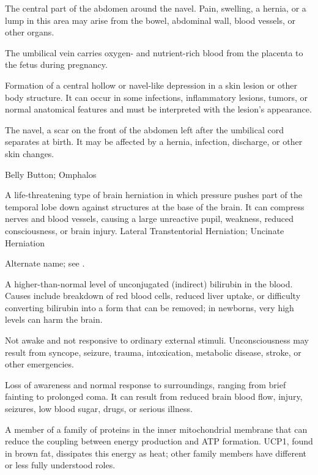  The central part of the abdomen around the navel. Pain, swelling, a hernia, or a lump in this area may arise from the bowel, abdominal wall, blood vessels, or other organs.

 The umbilical vein carries oxygen- and nutrient-rich blood from the placenta to the fetus during pregnancy.

 Formation of a central hollow or navel-like depression in a skin lesion or other body structure. It can occur in some infections, inflammatory lesions, tumors, or normal anatomical features and must be interpreted with the lesion’s appearance.

 The navel, a scar on the front of the abdomen left after the umbilical cord separates at birth. It may be affected by a hernia, infection, discharge, or other skin changes.

\synonyms
Belly Button; Omphalos

 A life-threatening type of brain herniation in which pressure pushes part of the temporal lobe down against structures at the base of the brain. It can compress nerves and blood vessels, causing a large unreactive pupil, weakness, reduced consciousness, or brain injury.
\synonyms
Lateral Transtentorial Herniation; Uncinate Herniation

 Alternate name; see .

 A higher-than-normal level of unconjugated (indirect) bilirubin in the blood. Causes include breakdown of red blood cells, reduced liver uptake, or difficulty converting bilirubin into a form that can be removed; in newborns, very high levels can harm the brain.

 Not awake and not responsive to ordinary external stimuli. Unconsciousness may result from syncope, seizure, trauma, intoxication, metabolic disease, stroke, or other emergencies.

 Loss of awareness and normal response to surroundings, ranging from brief fainting to prolonged coma. It can result from reduced brain blood flow, injury, seizures, low blood sugar, drugs, or serious illness.

 A member of a family of proteins in the inner mitochondrial membrane that can reduce the coupling between energy production and ATP formation. UCP1, found in brown fat, dissipates this energy as heat; other family members have different or less fully understood roles.

